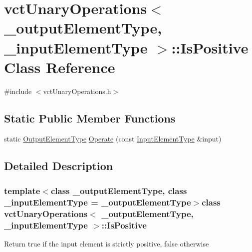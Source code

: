 \hypertarget{classvct_unary_operations_1_1_is_positive}{\section{vct\-Unary\-Operations$<$ \-\_\-output\-Element\-Type, \-\_\-input\-Element\-Type $>$\-:\-:Is\-Positive Class Reference}
\label{classvct_unary_operations_1_1_is_positive}
}


{\ttfamily \#include $<$vct\-Unary\-Operations.\-h$>$}

\subsection*{Static Public Member Functions}
\begin{DoxyCompactItemize}
\item 
static \hyperlink{classvct_unary_operations_a42306ac3dd20d32c6d6c66ac3fa2e7b9}{Output\-Element\-Type} \hyperlink{classvct_unary_operations_1_1_is_positive_ae17a13a599c4302d67073b77da3b95c7}{Operate} (const \hyperlink{classvct_unary_operations_abf3b77bb7b8abd7ba72a6a45a65696a7}{Input\-Element\-Type} \&input)
\end{DoxyCompactItemize}


\subsection{Detailed Description}
\subsubsection*{template$<$class \-\_\-output\-Element\-Type, class \-\_\-input\-Element\-Type = \-\_\-output\-Element\-Type$>$class vct\-Unary\-Operations$<$ \-\_\-output\-Element\-Type, \-\_\-input\-Element\-Type $>$\-::\-Is\-Positive}

Return true if the input element is strictly positive, false otherwise 

